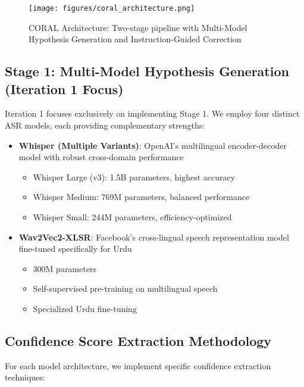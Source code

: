 \begin{figure}[H]
    \centering
    \texttt{[image: figures/coral\_architecture.png]}
    \caption{CORAL Architecture: Two-stage pipeline with Multi-Model Hypothesis Generation and Instruction-Guided Correction}
    \label{fig:coral_architecture}
\end{figure}

\subsection{Stage 1: Multi-Model Hypothesis Generation (Iteration 1 Focus)}

Iteration 1 focuses exclusively on implementing Stage 1. We employ four distinct ASR models, each providing complementary strengths:

\begin{itemize}
    \item \textbf{Whisper (Multiple Variants)}: OpenAI's multilingual encoder-decoder model with robust cross-domain performance
    \begin{itemize}
        \item Whisper Large (v3): 1.5B parameters, highest accuracy
        \item Whisper Medium: 769M parameters, balanced performance
        \item Whisper Small: 244M parameters, efficiency-optimized
    \end{itemize}
    
    \item \textbf{Wav2Vec2-XLSR}: Facebook's cross-lingual speech representation model fine-tuned specifically for Urdu
    \begin{itemize}
        \item 300M parameters
        \item Self-supervised pre-training on multilingual speech
        \item Specialized Urdu fine-tuning
    \end{itemize}
\end{itemize}

\subsection{Confidence Score Extraction Methodology}

For each model architecture, we implement specific confidence extraction techniques:

